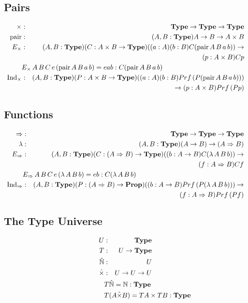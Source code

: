 \documentclass[acmtocl]{acmtrans2m}
\newcommand{\Type}{\mathbf{Type}}
\newcommand{\Prop}{\mathbf{Prop}}
\newcommand{\Prf}[1]{Prf \left( {#1} \right)}
\newcommand{\IX}{\mathrm{Ind}_\times}
\newcommand{\IA}{\mathrm{Ind}_{\boldarrow}}
\newcommand{\boldarrow}{\Rightarrow}
\begin{document}
\subsection{Pairs}
\begin{eqnarray*}
\times & : & \Type \rightarrow \Type \rightarrow \Type \\
\mathrm{pair} & : & (A, B  : \Type) A \rightarrow B \rightarrow A \times B \\
E_\times & : & (A,B : \Type) (C : A \times B \rightarrow \Type) ((a : A) (b : B) C (\mathrm{pair} \, A \, B \, a \, b)) \rightarrow \\
& & \quad (p : A \times B) C p \\
\lefteqn{E_\times \, A \, B \, C \, e \, (\mathrm{pair} \, A \, B \, a \, b) = e a b : C (\mathrm{pair} \, A \, B \, a \, b)} \\
\IX & : & (A,B : \Type) (P : A \times B \rightarrow \Type) ((a : A) (b : B) \Prf{P(\mathrm{pair} \, A \, B \, a \, b)}) \\
& & \quad \rightarrow (p : A \times B) \Prf{Pp} \\
\end{eqnarray*}
\subsection{Functions}
\begin{eqnarray*}
\boldarrow & : & \Type \rightarrow \Type \rightarrow \Type \\
\lambda & : & (A,B : \Type) (A \rightarrow B) \rightarrow (A \boldarrow B) \\
E_{\boldarrow} & : & (A, B : \Type) (C : (A \boldarrow B) \rightarrow \Type) ((b : A \rightarrow B) C (\lambda \, A \, B \, b)) \rightarrow \\
& & \quad (f : A \boldarrow B) C f \\
\lefteqn{E_{\boldarrow} \, A \, B \, C \, e \, (\lambda \, A \, B \, b) = e b : C (\lambda \, A \, B \, b)} \\
\IA & : & (A, B : \Type) (P : (A \boldarrow B) \rightarrow \Prop) ((b : A \rightarrow B) \Prf{P (\lambda \, A \, B \, b)}) \rightarrow \\
& & \quad (f : A \boldarrow B) \Prf{P f}
\end{eqnarray*}
\subsection{The Type Universe}
\begin{eqnarray*}
U & : & \Type \\
T & : & U \rightarrow \Type \\
\hat{\mathbb{N}} & : & U \\
\hat{\times} & : & U \rightarrow U \rightarrow U \\
\lefteqn{T \hat{\mathbb{N}} = \mathbb{N} : \Type} \\
\lefteqn{T (A \hat{\times} B) = T A \times T B : \Type}
\end{eqnarray*}
\end{document}
